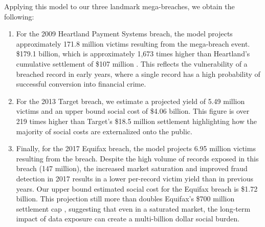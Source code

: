 Applying this model to our three landmark mega-breaches, we obtain the following: 
\begin{enumerate}
\item For the 2009 Heartland Payment Systems breach, the model projects approximately 171.8 million victims resulting from the mega-breach event. %
 \$179.1 billion, which is approximately 1,673 times higher than Heartland's cumulative settlement of \$107 million \cite{heartland_amex_2009, heartland_mastercard_2010, heartland_visa_2010, heartland_consumer_2012}.  This reflects the vulnerability of a breached record in early years, where a single record has a high probability of successful conversion into financial crime. 

\item For the 2013 Target breach, we estimate a projected yield of 5.49 million victims and an upper bound social cost of \$4.06 billion. This figure is over 219 times higher than Target's \$18.5 million settlement \cite{TexasAG_TargetSettlement} highlighting how the majority of social costs are externalized onto the public. 



\item 
Finally, for the 2017 Equifax breach, the model projects 6.95 million victims resulting from the breach. Despite the high volume of records exposed in this breach (147 million), the increased market saturation and improved fraud detection in 2017 results in a lower per-record victim yield than in previous years. Our upper bound estimated social cost for the Equifax breach is \$1.72 billion. This projection still more than doubles Equifax's \$700 million settlement cap \cite{FTC_EquifaxSettlement}, suggesting that even in a saturated market, the long-term impact of data exposure can create a multi-billion dollar social burden.



\end{enumerate}


